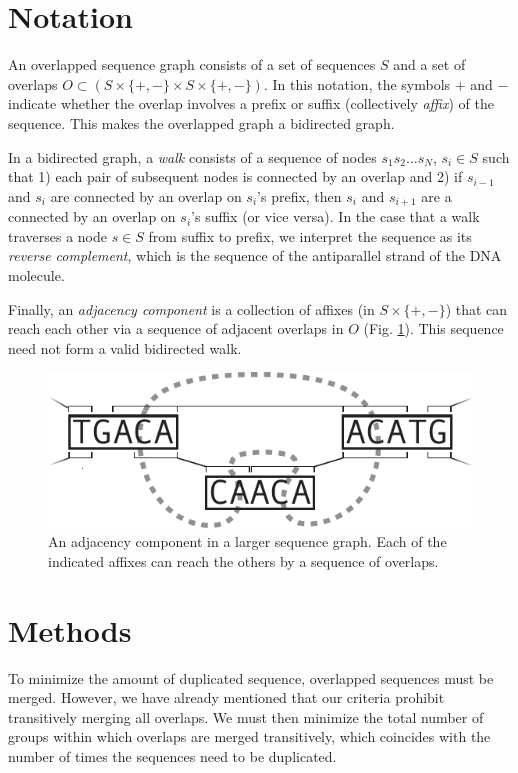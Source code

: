 \documentclass[11pt]{ucthesis}
\newcommand{\figref}[1]{Fig. \ref{fig:#1}}
\begin{document}
\section{Notation}

An overlapped sequence graph consists of a set of sequences $S$ and a set of overlaps $O \subset (S \times \{+,-\} \times S \times \{+,-\})$. 
In this notation, the symbols $+$ and $-$ indicate whether the overlap involves a prefix or suffix (collectively \emph{affix}) of the sequence.
This makes the overlapped graph a bidirected graph. 

In a bidirected graph, a \emph{walk} consists of a sequence of nodes $s_1s_2\ldots s_N$, $s_i \in S$ such that 1) each pair of subsequent nodes is connected by an overlap and 2) if $s_{i-1}$ and $s_i$ are connected by an overlap on $s_i$'s prefix, then $s_i$ and $s_{i+1}$ are a connected by an overlap on $s_i$'s suffix (or vice versa).
In the case that a walk traverses a node $s \in S$ from suffix to prefix, we interpret the sequence as its \emph{reverse complement}, which is the sequence of the antiparallel strand of the DNA molecule. 

Finally, an \emph{adjacency component} is a collection of affixes (in $S \times \{+,-\}$) that can reach each other via a sequence of adjacent overlaps in $O$ (\figref{adjacency}).
This sequence need not form a valid bidirected walk.

\begin{figure}
\begin{center}
\includegraphics[width=.6\textwidth]{bluntfigures/adjacency_component_3.pdf}
\caption{An adjacency component in a larger sequence graph. Each of the indicated affixes can reach the others by a sequence of overlaps.} \label{fig:adjacency}
\end{center}
\end{figure}

\section{Methods}

To minimize the amount of duplicated sequence, overlapped sequences must be merged. 
However, we have already mentioned that our criteria prohibit transitively merging all overlaps.
We must then minimize the total number of groups within which overlaps are merged transitively, which coincides with the number of times the sequences need to be duplicated.
\end{document}
